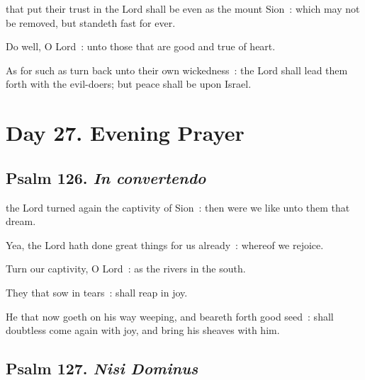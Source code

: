 
 that put their trust in the Lord shall be even as the mount Sion~: which may not be removed, but standeth fast for ever.\par
{}
Do well, O Lord~: unto those that are good and true of heart.\par
{}As for such as turn back unto their own wickedness~: the Lord shall lead them forth with the evil-doers; but peace shall be upon Israel.\par

\section*{Day 27. Evening Prayer}

\subsection{Psalm 126. \textit{In convertendo}}


 the Lord turned again the captivity of Sion~: then were we like unto them that dream.\par
{}
Yea, the Lord hath done great things for us already~: whereof we rejoice.\par
{}Turn our captivity, O Lord~: as the rivers in the south.\par
{}They that sow in tears~: shall reap in joy.\par
{}He that now goeth on his way weeping, and beareth forth good seed~: shall doubtless come again with joy, and bring his sheaves with him.\par

\subsection{Psalm 127. \textit{Nisi Dominus}}

